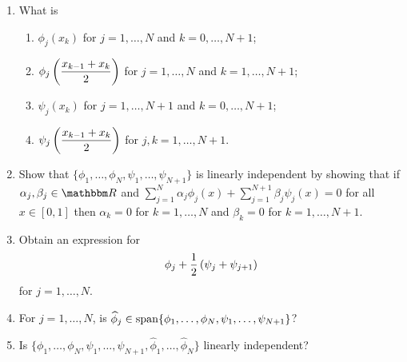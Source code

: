 \begin{enumerate}
\item What is
\\
\begin{enumerate}
\item $\displaystyle{\phi_j\left(x_k\right)}$ for $j=1,\ldots,N$ and $k=0,\ldots,N+1$;
\\
\item $\displaystyle{\phi_j\left({x_{k-1}+x_k \over 2}\right)}$ for $j=1,\ldots,N$ and $k=1,\ldots,N+1$;
\\
\item $\displaystyle{\psi_j\left(x_k\right)}$ for $j=1,\ldots,N+1$ and $k=0,\ldots,N+1$;
\\
\item $\displaystyle{\psi_j\left({x_{k-1}+x_k \over 2}\right)}$ for $j,k=1,\ldots,N+1$.
\\
\end{enumerate}
\item Show that $\{\phi_1,\ldots,\phi_N,\psi_1,\ldots,\psi_{N+1}\}$ is linearly independent by showing that if $\alpha_j,\beta_j\in\R$ and $\displaystyle{\sum_{j=1}^N\alpha_j\phi_j(x)+\sum_{j=1}^{N+1}\beta_j\psi_j(x)=0}$ for all $x\in[0,1]$ then $\alpha_k=0$ for $k=1,\ldots,N$ and $\beta_k=0$ for $k=1,\ldots,N+1$.
\\
\item Obtain an expression for
\[
\phi_j+{1 \over 2}\left(\psi_j+\psi_{j+1}\right)
\]
for $j=1,\ldots,N$.
\\
\item For $j=1,\ldots,N$, is $\widehat{\phi}_j\in{\rm span}\{\phi_1,\ldots,\phi_N,\psi_1,\ldots,\psi_{N+1}\}$?
\\
\item Is $\{\phi_1,\ldots,\phi_N,\psi_1,\ldots,\psi_{N+1},\widehat{\phi}_1,\ldots,\widehat{\phi}_N\}$ linearly independent?
\end{enumerate}




